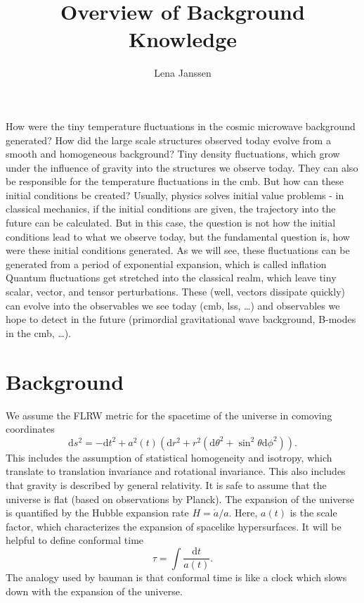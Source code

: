 \documentclass[12pt]{article}
\title{Overview of Background Knowledge}
\author{Lena Janssen}
\date{}
\begin{document}
\maketitle

\hypersetup{linkcolor=black}
\tableofcontents

How were the tiny temperature fluctuations in the cosmic microwave background generated? How did the large scale structures observed today evolve from a smooth and homogeneous background? Tiny density fluctuations, which grow under the influence of gravity into the structures we observe today. They can also be responsible for the temperature fluctuations in the cmb. But how can these initial conditions be created? Usually, physics solves initial value problems - in classical mechanics, if the initial conditions are given, the trajectory into the future can be calculated. But in this case, the question is not how the initial conditions lead to what we observe today, but the fundamental question is, how were these initial conditions generated. As we will see, these fluctuations can be generated from a period of exponential expansion, which is called inflation Quantum fluctuations get stretched into the classical realm, which leave tiny scalar, vector, and tensor perturbations. These (well, vectors dissipate quickly) can evolve into the observables we see today (cmb, lss, \dots) and observables we hope to detect in the future (primordial gravitational wave background, B-modes in the cmb, \dots). 

\section{Background}
We assume the FLRW metric for the spacetime of the universe in comoving coordinates
\begin{equation}
    \mathrm{d}s^2 = -\mathrm{d}t^2 + a^2(t)\left(\mathrm{d}r^2 + r^2(\mathrm{d}\theta^2 + \sin^2\theta \mathrm{d}\phi^2)\right).
\end{equation}
This includes the assumption of statistical homogeneity and isotropy, which translate to translation invariance and rotational invariance. This also includes that gravity is described by general relativity. It is safe to assume that the universe is flat (based on observations by Planck). The expansion of the universe is quantified by the Hubble expansion rate $H= \dot{a}/a$. Here, $a(t)$ is the scale factor, which characterizes the expansion of spacelike hypersurfaces. It will be helpful to define conformal time
\begin{equation}
    \tau = \int \frac{\mathrm{d}t}{a(t)}.
\end{equation}
The analogy used by bauman is that conformal time is like a clock which slows down with the expansion of the universe. 
\end{document}
